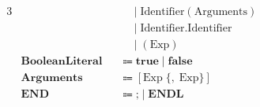 \documentclass[a4paper,11pt]{article}
\begin{document}
\begin{alignat*}{3}
&                       &&\quad\mid  \text{Identifier}(\text{Arguments}) &&\\
&                       &&\quad\mid  \text{Identifier}.\text{Identifier} &&\\
&                       &&\quad\mid  (\text{Exp}) &&\\
&\textbf{BooleanLiteral}  &&\Coloneqq  \textbf{true}\mid\textbf{false} &&\\
&\textbf{Arguments}       &&\Coloneqq  [\text{Exp}\;\lbrace,\;\text{Exp}\rbrace] &&\\
&\textbf{END}              &&\Coloneqq  \textbf{;}\mid\textbf{ENDL} &&
\end{alignat*}
\end{document}
